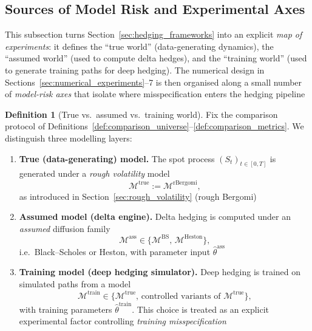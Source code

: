 \documentclass[12pt,a4paper]{article}
\theoremstyle{definition}
\newtheorem{definition}{Definition}[section]
\theoremstyle{plain}
\theoremstyle{remark}
\theoremstyle{plain}
\begin{document}
\subsection{Sources of Model Risk and Experimental Axes}
\label{subsec:model_risk_axes}

\noindent
This subsection turns Section~\ref{sec:hedging_frameworks} into an explicit \emph{map of experiments}:
it defines the ``true world'' (data-generating dynamics), the ``assumed world'' (used to compute delta hedges),
and the ``training world'' (used to generate training paths for deep hedging). The numerical design in
Sections~\ref{sec:numerical_experiments}--7 is then organised along a small number of \emph{model-risk axes}
that isolate where misspecification enters the hedging pipeline \cite{GatheralRough,BayerFriz2016,BlackScholes1973,Heston1993,Buehler2019DeepHedging,Horvath2021DeepRough}

\begin{definition}[True vs.\ assumed vs.\ training world]
\label{def:true_assumed_training_worlds}
Fix the comparison protocol of Definitions~\ref{def:comparison_universe}--\ref{def:comparison_metrics}.
We distinguish three modelling layers:

\begin{enumerate}
\item \textbf{True (data-generating) model.}
The spot process $(S_t)_{t\in[0,T]}$ is generated under a \emph{rough volatility} model
\[
\mathcal{M}^{\mathrm{true}} := \mathcal{M}^{\mathrm{rBergomi}},
\]
as introduced in Section~\ref{sec:rough_volatility} (rough Bergomi) \cite{GatheralRough,BayerFriz2016}

\item \textbf{Assumed model (delta engine).}
Delta hedging is computed under an \emph{assumed} diffusion family
\[
\mathcal{M}^{\mathrm{ass}} \in \{\mathcal{M}^{\mathrm{BS}},\,\mathcal{M}^{\mathrm{Heston}}\},
\]
i.e.\ Black--Scholes or Heston, with parameter input $\hat\theta^{\mathrm{ass}}$ \cite{BlackScholes1973,Heston1993}

\item \textbf{Training model (deep hedging simulator).}
Deep hedging is trained on simulated paths from a model
\[
\mathcal{M}^{\mathrm{train}} \in \{\mathcal{M}^{\mathrm{true}},\,\text{controlled variants of }\mathcal{M}^{\mathrm{true}}\},
\]
with training parameters $\hat\theta^{\mathrm{train}}$.
This choice is treated as an explicit experimental factor controlling \emph{training misspecification} \cite{Buehler2019DeepHedging,Horvath2021DeepRough}
\end{enumerate}
\end{definition}
\end{document}
